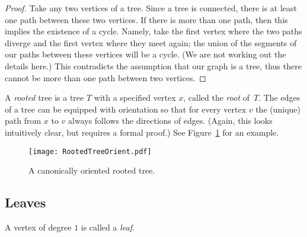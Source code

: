 \begin{page}
\setcounter{section}{2}
\setcounter{subsection}{2}
\setcounter{dfn}{2}
\label{portion:214}

\begin{proof}
Take any two vertices of a tree.
Since a tree is connected, there is at least one path between these two vertices.
If there is more than one path, then this implies the existence of a cycle.
Namely, take the first vertex where the two paths diverge and the first vertex where they meet again;
the union of the segments of our paths between these vertices will be a cycle.
(We are not working out the details here.)
This contradicts the assumption that our graph is a tree, thus there cannot be more than one path between two vertices.
\end{proof}

A \emph{rooted} tree is a tree $T$ with a specified vertex $x$, called the \emph{root} of~$T$.
The edges of a tree can be equipped with orientation so that for every vertex $v$ the (unique) path from $x$ to $v$ always follows the directions of edges.
(Again, this looks intuitively clear, but requires a formal proof.)
See Figure~\ref{fig:RootedTreeOrient} for an example.

\begin{figure}[ht]
\begin{center}
\texttt{[image: RootedTreeOrient.pdf]}
\end{center}
\caption{A canonically oriented rooted tree.}
\label{fig:RootedTreeOrient}
\end{figure}



\end{page}

\begin{page}
\setcounter{section}{2}
\setcounter{subsection}{2}
\setcounter{dfn}{2}
\label{portion:215}

\subsection{Leaves}

\end{page}

\begin{page}
\setcounter{section}{2}
\setcounter{subsection}{2}
\setcounter{dfn}{3}
\label{portion:217}

\begin{dfn}
A vertex of degree $1$ is called a \emph{leaf}.
\end{dfn}

\end{page}

